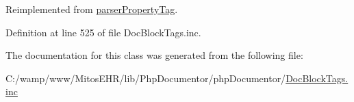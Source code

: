 \-Reimplemented from \hyperlink{classparser_property_tag_a4a925d6b38bcf3957c713a7d3dc7da1f}{parser\-Property\-Tag}.



\-Definition at line 525 of file \-Doc\-Block\-Tags.\-inc.



\-The documentation for this class was generated from the following file\-:\begin{DoxyCompactItemize}
\item 
\-C\-:/wamp/www/\-Mitos\-E\-H\-R/lib/\-Php\-Documentor/php\-Documentor/\hyperlink{_doc_block_tags_8inc}{\-Doc\-Block\-Tags.\-inc}\end{DoxyCompactItemize}
